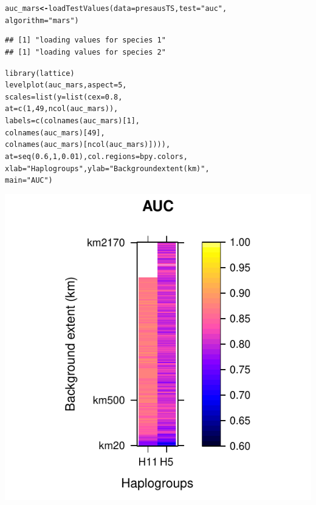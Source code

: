 \documentclass[10pt,a4paper]{article}\usepackage[]{graphicx}\usepackage[]{color}
\makeatletter
\def\maxwidth{ %
  \ifdim\Gin@nat@width>\linewidth
    \linewidth
  \else
    \Gin@nat@width
  \fi
}
\newcommand{\hlnum}[1]{\textcolor[rgb]{0.533,0,0.133}{#1}}%
\newcommand{\hlstr}[1]{\textcolor[rgb]{0.667,0.267,0}{#1}}%
\newcommand{\hlstd}[1]{\textcolor[rgb]{0,0,0}{#1}}%
\newcommand{\hlkwb}[1]{\textcolor[rgb]{0,0,0.4}{\textbf{#1}}}%
\newcommand{\hlkwc}[1]{\textcolor[rgb]{0,0,0.4}{#1}}%
\newcommand{\hlkwd}[1]{\textcolor[rgb]{0,0.267,0.4}{#1}}%
\newenvironment{kframe}{%
 \def\at@end@of@kframe{}%
 \ifinner\ifhmode%
  \def\at@end@of@kframe{\end{minipage}}%
  \begin{minipage}{\columnwidth}%
 \fi\fi%
 \def\FrameCommand##1{\hskip\@totalleftmargin \hskip-\fboxsep
 \colorbox{shadecolor}{##1}\hskip-\fboxsep
     \hskip-\linewidth \hskip-\@totalleftmargin \hskip\columnwidth}%
 \MakeFramed {\advance\hsize-\width
   \@totalleftmargin\z@ \linewidth\hsize
   \@setminipage}}%
 {\par\unskip\endMakeFramed%
 \at@end@of@kframe}
\newenvironment{knitrout}{}{} %
\makeatother
\begin{document}
\begin{knitrout}
\color{fgcolor}\begin{kframe}
\begin{alltt}
\hlstd{auc_mars} \hlkwb{<-}\hlkwd{loadTestValues}\hlstd{(}\hlkwc{data} \hlstd{= presausTS,} \hlkwc{test} \hlstd{=} \hlstr{"auc"}\hlstd{,}
                          \hlkwc{algorithm} \hlstd{=} \hlstr{"mars"}\hlstd{)}
\end{alltt}
\begin{verbatim}
## [1] "loading values for species 1"
## [1] "loading values for species 2"
\end{verbatim}
\begin{alltt}
\hlkwd{library}\hlstd{(lattice)}
\hlkwd{levelplot}\hlstd{(auc_mars,} \hlkwc{aspect} \hlstd{=} \hlnum{5}\hlstd{,}
          \hlkwc{scales} \hlstd{=} \hlkwd{list}\hlstd{(}\hlkwc{y} \hlstd{=} \hlkwd{list}\hlstd{(}\hlkwc{cex} \hlstd{=} \hlnum{0.8}\hlstd{,}
              \hlkwc{at} \hlstd{=} \hlkwd{c}\hlstd{(}\hlnum{1}\hlstd{,} \hlnum{49}\hlstd{,} \hlkwd{ncol}\hlstd{(auc_mars)),}
              \hlkwc{labels} \hlstd{=} \hlkwd{c}\hlstd{(}\hlkwd{colnames}\hlstd{(auc_mars)[}\hlnum{1}\hlstd{],}
                        \hlkwd{colnames}\hlstd{(auc_mars)[}\hlnum{49}\hlstd{],}
                        \hlkwd{colnames}\hlstd{(auc_mars)[}\hlkwd{ncol}\hlstd{(auc_mars)]))),}
          \hlkwc{at} \hlstd{=} \hlkwd{seq}\hlstd{(}\hlnum{0.6}\hlstd{,} \hlnum{1}\hlstd{,} \hlnum{0.01}\hlstd{),} \hlkwc{col.regions} \hlstd{= bpy.colors,}
          \hlkwc{xlab} \hlstd{=} \hlstr{"Haplogroups"}\hlstd{,} \hlkwc{ylab} \hlstd{=} \hlstr{"Background extent (km)"}\hlstd{,}
          \hlkwc{main} \hlstd{=} \hlstr{"AUC"}\hlstd{)}
\end{alltt}
\end{kframe}

{\centering \includegraphics[width=\maxwidth]{figure/graphics-mopa13-1} 

}
\end{knitrout}
\end{document}
